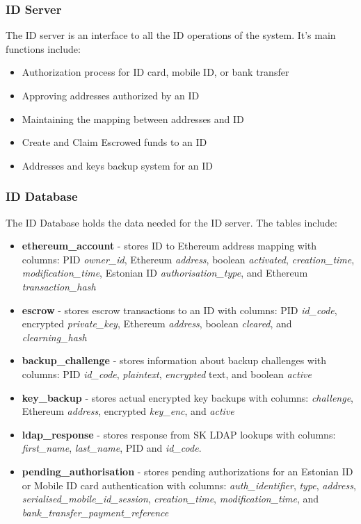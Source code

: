 \documentclass[a4paper,12pt]{article} %
\begin{document}
{\subsubsection{ID Server} \label{sssec:3.5:idServer}
The ID server is an interface to all the ID operations of the system. It's main functions include:

\begin{itemize}
	\item Authorization process for ID card, mobile ID, or bank transfer
	\item Approving addresses authorized by an ID
	\item Maintaining the mapping between addresses and ID
	\item Create and Claim Escrowed funds to an ID
	\item Addresses and keys backup system for an ID
\end{itemize}

\subsubsection{ID Database} \label{sssec:3.5:idDatabase}

The ID Database holds the data needed for the ID server. The tables include:

\begin{itemize}
	\item \textbf{ethereum\_account} - stores ID to Ethereum address mapping with columns: PID \textit{owner\_id}, Ethereum \textit{address}, boolean \textit{activated}, \textit{creation\_time}, \textit{modification\_time}, Estonian ID \textit{authorisation\_type}, and Ethereum \textit{transaction\_hash}
	\item \textbf{escrow} - stores escrow transactions to an ID with columns: PID \textit{id\_code}, encrypted \textit{private\_key}, Ethereum \textit{address}, boolean \textit{cleared}, and \textit{clearning\_hash}
	\item \textbf{backup\_challenge} - stores information about backup challenges with columns: PID \textit{id\_code}, \textit{plaintext}, \textit{encrypted} text, and boolean \textit{active}
	\item \textbf{key\_backup} - stores actual encrypted key backups with columns: \textit{challenge}, Ethereum \textit{address}, encrypted \textit{key\_enc}, and \textit{active}
	\item \textbf{ldap\_response} - stores response from SK LDAP lookups with columns: \textit{first\_name}, \textit{last\_name}, PID and \textit{id\_code}.
	\item \textbf{pending\_authorisation} - stores pending authorizations for an Estonian ID or Mobile ID card authentication with columns: \textit{auth\_identifier}, \textit{type}, \textit{address}, \textit{serialised\_mobile\_id\_session}, \textit{creation\_time}, \textit{modification\_time}, and \textit{bank\_transfer\_payment\_reference}
\end{itemize}

}
\end{document}
